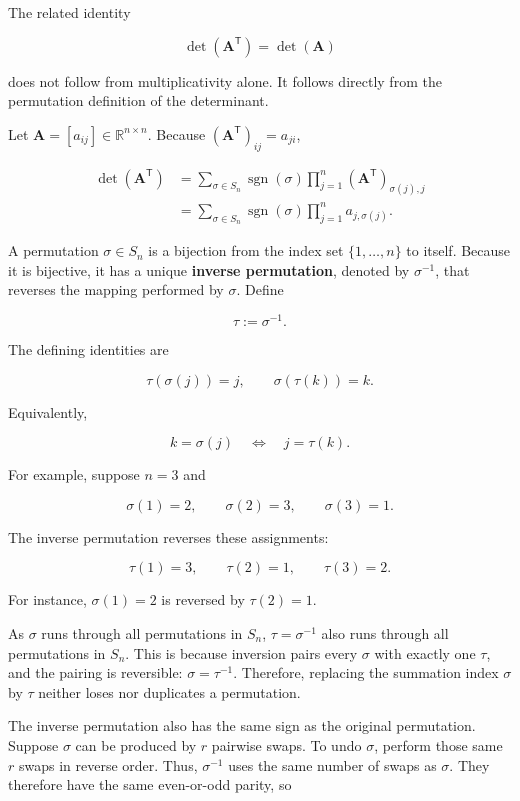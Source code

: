 \documentclass[
  australian,
  12pt,
  letterpaper,
  DIV=11,
  numbers=noendperiod,
  twoside]{scrreprt}
\begin{document}
The related identity

\[
\boxed{\det(\mathbf A^{\mathsf T})=\det(\mathbf A)}
\]

does not follow from multiplicativity alone. It follows directly from
the permutation definition of the determinant.

Let \(\mathbf A=[a_{ij}]\in\mathbb R^{n\times n}\). Because
\((\mathbf A^{\mathsf T})_{ij}=a_{ji}\),

\[
\begin{aligned}
\det(\mathbf A^{\mathsf T})
&=\sum_{\sigma\in S_n}\operatorname{sgn}(\sigma)
\prod_{j=1}^{n}(\mathbf A^{\mathsf T})_{\sigma(j),j}\\
&=\sum_{\sigma\in S_n}\operatorname{sgn}(\sigma)
\prod_{j=1}^{n}a_{j,\sigma(j)}.
\end{aligned}
\]

A permutation \(\sigma\in S_n\) is a bijection from the index set
\(\{1,\ldots,n\}\) to itself. Because it is bijective, it has a unique
\textbf{inverse permutation}, denoted by \(\sigma^{-1}\), that reverses
the mapping performed by \(\sigma\). Define

\[
\tau\mathrel{:=}\sigma^{-1}.
\]

The defining identities are

\[
\tau(\sigma(j))=j,
\qquad
\sigma(\tau(k))=k.
\]

Equivalently,

\[
k=\sigma(j)
\quad\Longleftrightarrow\quad
j=\tau(k).
\]

For example, suppose \(n=3\) and

\[
\sigma(1)=2,
\qquad
\sigma(2)=3,
\qquad
\sigma(3)=1.
\]

The inverse permutation reverses these assignments:

\[
\tau(1)=3,
\qquad
\tau(2)=1,
\qquad
\tau(3)=2.
\]

For instance, \(\sigma(1)=2\) is reversed by \(\tau(2)=1\).

As \(\sigma\) runs through all permutations in \(S_n\),
\(\tau=\sigma^{-1}\) also runs through all permutations in \(S_n\). This
is because inversion pairs every \(\sigma\) with exactly one \(\tau\),
and the pairing is reversible: \(\sigma=\tau^{-1}\). Therefore,
replacing the summation index \(\sigma\) by \(\tau\) neither loses nor
duplicates a permutation.

The inverse permutation also has the same sign as the original
permutation. Suppose \(\sigma\) can be produced by \(r\) pairwise swaps.
To undo \(\sigma\), perform those same \(r\) swaps in reverse order.
Thus, \(\sigma^{-1}\) uses the same number of swaps as \(\sigma\). They
therefore have the same even-or-odd parity, so
\end{document}
